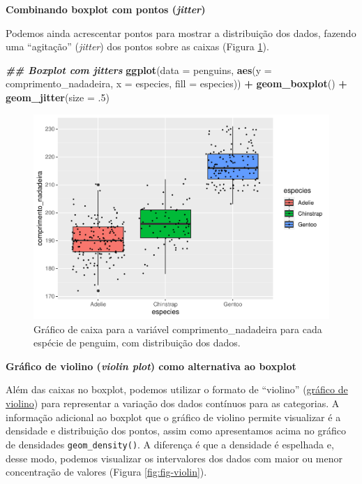 \documentclass[
]{article}
\newenvironment{Shaded}{\begin{snugshade}}{\end{snugshade}}
\newcommand{\AttributeTok}[1]{\textcolor[rgb]{0.13,0.29,0.53}{#1}}
\newcommand{\DecValTok}[1]{\textcolor[rgb]{0.00,0.00,0.81}{#1}}
\newcommand{\DocumentationTok}[1]{\textcolor[rgb]{0.56,0.35,0.01}{\textbf{\textit{#1}}}}
\newcommand{\FunctionTok}[1]{\textcolor[rgb]{0.13,0.29,0.53}{\textbf{#1}}}
\newcommand{\NormalTok}[1]{#1}
\newcommand{\SpecialCharTok}[1]{\textcolor[rgb]{0.81,0.36,0.00}{\textbf{#1}}}
\begin{document}
\textbf{Combinando boxplot com pontos (\emph{jitter})}

Podemos ainda acrescentar pontos para mostrar a distribuição dos dados, fazendo uma ``agitação'' (\emph{jitter}) dos pontos sobre as caixas (Figura \ref{fig:fig-boxplot-jitter}).

\begin{Shaded}
\begin{Highlighting}[]
\DocumentationTok{\#\# Boxplot com jitters}
\FunctionTok{ggplot}\NormalTok{(}\AttributeTok{data =}\NormalTok{ penguins, }
       \FunctionTok{aes}\NormalTok{(}\AttributeTok{y =}\NormalTok{ comprimento\_nadadeira, }
           \AttributeTok{x =}\NormalTok{ especies, }
           \AttributeTok{fill =}\NormalTok{ especies)) }\SpecialCharTok{+}
    \FunctionTok{geom\_boxplot}\NormalTok{() }\SpecialCharTok{+}
    \FunctionTok{geom\_jitter}\NormalTok{(}\AttributeTok{size =}\NormalTok{ .}\DecValTok{5}\NormalTok{)}
\end{Highlighting}
\end{Shaded}

\begin{figure}
\centering
\includegraphics{epr_files/figure-latex/fig-boxplot-jitter-1.pdf}
\caption{\label{fig:fig-boxplot-jitter}Gráfico de caixa para a variável comprimento\_nadadeira para cada espécie de penguim, com distribuição dos dados.}
\end{figure}

\textbf{Gráfico de violino (\emph{violin plot}) como alternativa ao boxplot}

Além das caixas no boxplot, podemos utilizar o formato de ``violino'' (\href{https://datavizproject.com/data-type/violin-plot/}{gráfico de violino}) para representar a variação dos dados contínuos para as categorias. A informação adicional ao boxplot que o gráfico de violino permite visualizar é a densidade e distribuição dos pontos, assim como apresentamos acima no gráfico de densidades \texttt{geom\_density()}. A diferença é que a densidade é espelhada e, desse modo, podemos visualizar os intervalores dos dados com maior ou menor concentração de valores (Figura \ref{fig:fig-violin}).
\end{document}
